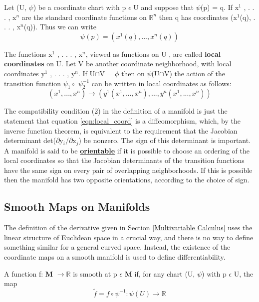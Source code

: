 Let (U, $\psi$) be a coordinate chart with p $\epsilon$ U and suppose that $\psi$(p) = q. If
x$^1$ , . . . , x$^n$ are the standard coordinate functions on $\mathbb{R}^n$ then q has coordinates
(x$^1$(q), . . . , x$^n$(q)). Thus we can write
\begin{equation}
    \psi(p) = (x^1(q), . . . , x^n(q))
\end{equation}

The functions x$^1$ , . . . , x$^n$, viewed as functions on U , are called \textbf{local coordinates} on U. 
Let V be another coordinate neighborhood, with local coordinates y$^1$ , . . . , y$^n$. 
If U$\cap$V = $\phi$ then on $\psi$(U$\cap$V) the action of the transition function $\psi_1 \circ$  $\psi_2^{-1}$ can be
written in local coordinates as follows:
\begin{equation}
    (x^1 , . . . , x^n ) \rightarrow (y^1 (x^1 , . . . , x^n ), . . . , y^n (x^1 , . . . , x^n ))
    \label{eqn:local_coord}
\end{equation}

The compatibility condition (2) in the definition of a manifold is just the statement that equation \ref{eqn:local_coord} is a diffeomorphism, which, by the inverse
function theorem, is equivalent to the requirement that the Jacobian determinant
det($\partial$y$_i$/$\partial$x$_j$) be nonzero. The sign of this determinant is important. 
A manifold is said to be \href{https://en.wikipedia.org/wiki/Orientability}{\textbf{orientable}}
if it is possible to choose an ordering of the local coordinates so that the Jacobian
determinants of the transition functions have the same sign on every pair of overlapping neighborhoods. 
If this is possible then the manifold has two opposite orientations, according to the choice of sign.

\subsection{Smooth Maps on Manifolds}
The definition of the derivative given in Section \ref{Multivariable Calculus} uses the linear structure of
Euclidean space in a crucial way, and there is no way to define something similar
for a general curved space. Instead, the existence of the coordinate maps on
a smooth manifold is used to define differentiability.

A function f: \textbf{M} $\rightarrow \mathbb{R}$ is smooth at p $\epsilon$ \textbf{M} if, for any chart (U, $\psi$)
with p $\epsilon$ U, the map
\begin{equation}
    \widetilde{f}= f \circ \psi^{-1}:\psi(U) \rightarrow \mathbb{R}
\end{equation}

